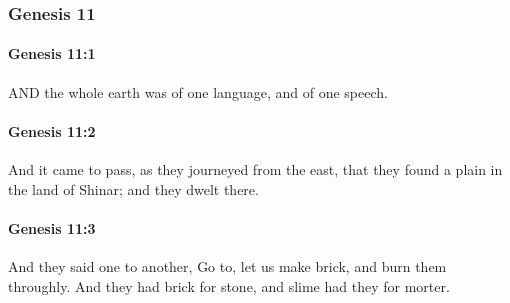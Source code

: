	\subsubsection{Genesis 11} %
		\label{GENESIS-11}
		
		\paragraph{Genesis 11:1} %
			\label{GENESIS-11-1}

			AND the whole earth was of one language, and of one speech.


		\paragraph{Genesis 11:2} %
			\label{GENESIS-11-2}

			And it came to pass, as they journeyed from the east, that they found a plain in the land of Shinar; and they dwelt there.


		\paragraph{Genesis 11:3} %
			\label{GENESIS-11-3}

			And they said one to another, Go to, let us make brick, and burn them throughly.  And they had brick for stone, and slime had they for morter.


